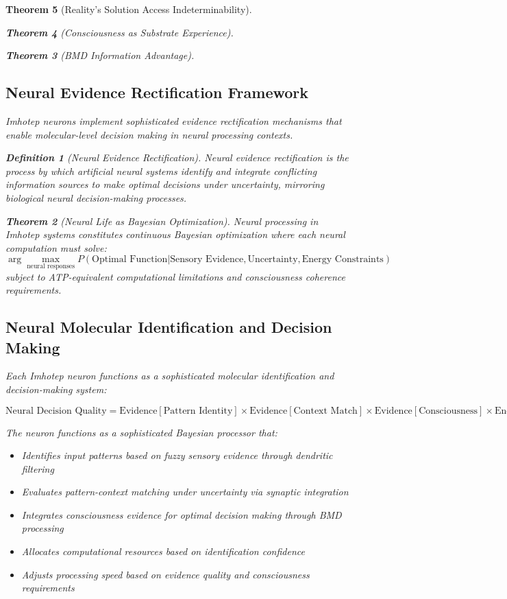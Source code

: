 \documentclass[12pt,a4paper]{article}
\newtheorem{theorem}{Theorem}[section]
\newtheorem{definition}[theorem]{Definition}
\theoremstyle{remark}
\begin{document}
\begin{theorem}[Reality's Solution Access Indeterminability]
\begin{theorem}[Consciousness as Substrate Experience]
\begin{theorem}[BMD Information Advantage]
{{{\subsection{Neural Evidence Rectification Framework}

Imhotep neurons implement sophisticated evidence rectification mechanisms that enable molecular-level decision making in neural processing contexts.

\begin{definition}[Neural Evidence Rectification]
Neural evidence rectification is the process by which artificial neural systems identify and integrate conflicting information sources to make optimal decisions under uncertainty, mirroring biological neural decision-making processes.
\end{definition}

\begin{theorem}[Neural Life as Bayesian Optimization]
Neural processing in Imhotep systems constitutes continuous Bayesian optimization where each neural computation must solve:
\begin{equation}
\arg\max_{\text{neural responses}} P(\text{Optimal Function} | \text{Sensory Evidence}, \text{Uncertainty}, \text{Energy Constraints})
\end{equation}
subject to ATP-equivalent computational limitations and consciousness coherence requirements.
\end{theorem}

\subsection{Neural Molecular Identification and Decision Making}

Each Imhotep neuron functions as a sophisticated molecular identification and decision-making system:

\begin{equation}
\text{Neural Decision Quality} = \text{Evidence}[\text{Pattern Identity}] \times \text{Evidence}[\text{Context Match}] \times \text{Evidence}[\text{Consciousness}] \times \text{Energy Budget}
\end{equation}

The neuron functions as a sophisticated Bayesian processor that:
\begin{itemize}
\item Identifies input patterns based on fuzzy sensory evidence through dendritic filtering
\item Evaluates pattern-context matching under uncertainty via synaptic integration
\item Integrates consciousness evidence for optimal decision making through BMD processing
\item Allocates computational resources based on identification confidence
\item Adjusts processing speed based on evidence quality and consciousness requirements
\end{itemize}

}}}
\end{theorem}
\end{theorem}
\end{theorem}
\end{document}
